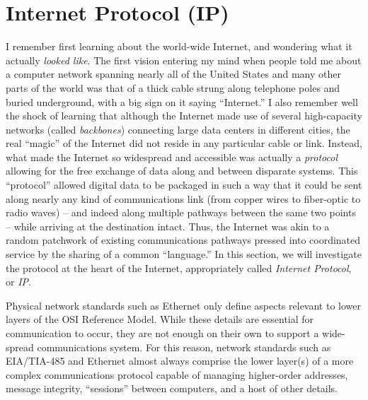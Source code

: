 \filbreak
\section{Internet Protocol (IP)}

I remember first learning about the world-wide Internet, and wondering what it actually \textit{looked like}.  The first vision entering my mind when people told me about a computer network spanning nearly all of the United States and many other parts of the world was that of a thick cable strung along telephone poles and buried underground, with a big sign on it saying ``Internet.''  I also remember well the shock of learning that although the Internet made use of several high-capacity networks (called \textit{backbones}) connecting large data centers in different cities, the real ``magic'' of the Internet did not reside in any particular cable or link.  Instead, what made the Internet so widespread and accessible was actually a \textit{protocol} allowing for the free exchange of data along and between disparate systems.  This ``protocol'' allowed digital data to be packaged in such a way that it could be sent along nearly any kind of communications link (from copper wires to fiber-optic to radio waves) -- and indeed along multiple pathways between the same two points -- while arriving at the destination intact.  Thus, the Internet was akin to a random patchwork of existing communications pathways pressed into coordinated service by the sharing of a common ``language.''  In this section, we will investigate the protocol at the heart of the Internet, appropriately called \textit{Internet Protocol}, or \textit{IP}.    

Physical network standards such as Ethernet only define aspects relevant to lower layers of the OSI Reference Model.  While these details are essential for communication to occur, they are not enough on their own to support a wide-spread communications system.  For this reason, network standards such as EIA/TIA-485 and Ethernet almost always comprise the lower layer(s) of a more complex communications protocol capable of managing higher-order addresses, message integrity, ``sessions'' between computers, and a host of other details.

